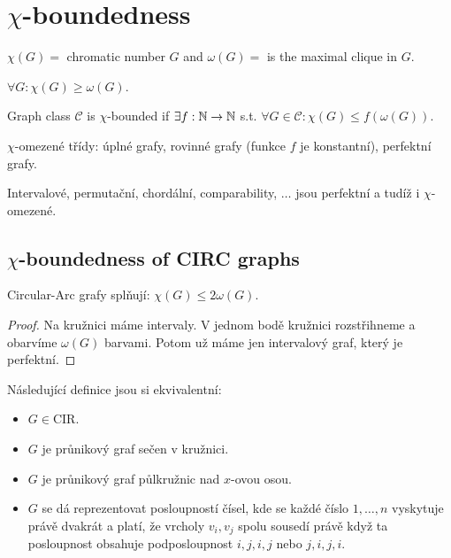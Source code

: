 \chapter{$\chi$-boundedness}

\begin{notation}
	$\chi(G) = $ chromatic number $G$ and $\omega(G) = $ is the maximal clique in $G$.
\end{notation}

\begin{observ}
	$\forall G: \chi(G) \geq \omega(G)$.
\end{observ}

\begin{defn}
	Graph class $\mathcal{C}$ is $\chi$-bounded if $\exists f : \mathbb{N} \to \mathbb{N}$ s.t. $\forall G \in \mathcal{C} : \chi(G) \leq f(\omega(G))$.
\end{defn}

\begin{example}
	$\chi$-omezené třídy: úplné grafy, rovinné grafy (funkce $f$ je konstantní), perfektní grafy.
\end{example}

\begin{observ}
	Intervalové, permutační, chordální, comparability, $\dots$ jsou perfektní a tudíž i $\chi$-omezené.
\end{observ}

\section{$\chi$-boundedness of CIRC graphs}

\begin{observ}
	Circular-Arc grafy splňují: $\chi(G) \leq 2 \omega(G)$.
\end{observ}

\begin{proof}
	Na kružnici máme intervaly. V jednom bodě kružnici rozstřihneme a obarvíme $\omega(G)$ barvami. Potom už máme jen intervalový graf, který je perfektní.
\end{proof}

\begin{defn}
	Následující definice jsou si ekvivalentní:
	
	\begin{itemize}
		\item $G \in \text{CIR}$.
		\item $G$ je průnikový graf sečen v kružnici.
		\item $G$ je průnikový graf půlkružnic nad $x$-ovou osou.
		\item $G$ se dá reprezentovat posloupností čísel, kde se každé číslo $1, \dots, n$ vyskytuje právě dvakrát a platí, že vrcholy $v_i, v_j$ spolu sousedí právě když ta posloupnost obsahuje podposloupnost $i,j,i,j$ nebo $j,i,j,i$.
	\end{itemize}
\end{defn}

